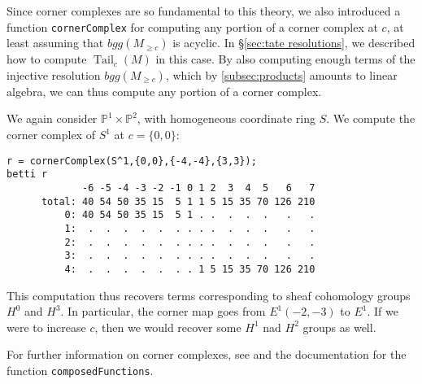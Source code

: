 \documentclass[twoside,12pt, leqno]{amsart}
\def\PP{{\mathbb P}}
\def\fix#1{{\bf ***Fix:} #1 {\bf ***}}
\begin{document}
Since corner complexes are so fundamental to this theory, we also introduced a function {\tt cornerComplex} for computing any portion of a corner complex at $c$, at least assuming that $bgg(M_{\geq c})$ is acyclic.  In \S\ref{sec:tate resolutions}, we described how to compute $\operatorname{Tail}_c(M)$ in this case.  By also computing enough terms of the injective resolution $bgg(M_{\geq c})$, which by \ref{subsec:products} amounts to linear algebra, we can thus compute any portion of a corner complex.   


\begin{example}
We again consider 
$\PP^1\times \PP^2$, with homogeneous coordinate ring $S$.
We compute the corner complex of $S^1$ at $c=\{0,0\}$:
{\small 
\begin{verbatim}
r = cornerComplex(S^1,{0,0},{-4,-4},{3,3});
betti r
             -6 -5 -4 -3 -2 -1 0 1 2  3  4  5   6   7
      total: 40 54 50 35 15  5 1 1 5 15 35 70 126 210
          0: 40 54 50 35 15  5 1 . .  .  .  .   .   .
          1:  .  .  .  .  .  . . . .  .  .  .   .   .
          2:  .  .  .  .  .  . . . .  .  .  .   .   .
          3:  .  .  .  .  .  . . . .  .  .  .   .   .
          4:  .  .  .  .  .  . . 1 5 15 35 70 126 210
\end{verbatim}
}
This computation thus recovers terms corresponding to sheaf cohomology groups $H^0$ and $H^3$.  In particular, the corner map goes from $E^1(-2,-3)$ to $E^1$.  If we were to increase $c$, then we would recover some $H^1$ nad $H^2$ groups as well.
\end{example}
For further information on corner complexes, see \cite[\S3]{EES} and the documentation for the function  {\tt composedFunctions}.
\end{document}
